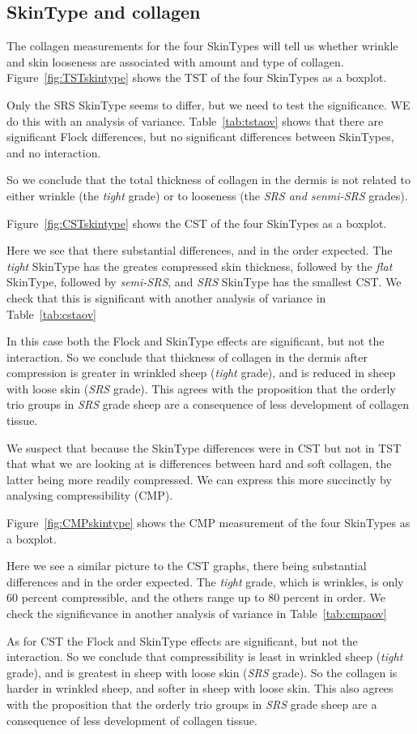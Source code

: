 \documentclass[titlepage]{article}  %
\begin{document}
\subsection{SkinType and collagen}
The collagen measurements for the four SkinTypes will tell us  whether wrinkle and skin looseness are associated with amount and type of collagen.  Figure~\ref{fig:TSTskintype} shows the TST of the four SkinTypes as a boxplot.

Only the SRS SkinType seems to differ, but we need to test the significance. WE do this with an analysis of variance. Table~\ref{tab:tstaov} shows that there are significant Flock differences, but no significant differences between SkinTypes, and no interaction.

So we conclude that the total thickness of collagen in the dermis is not related to either wrinkle (the {\em tight} grade) or to looseness (the {\em SRS and senmi-SRS} grades).

Figure~\ref{fig:CSTskintype} shows the CST of the four SkinTypes as a boxplot.

Here we see that there substantial differences, and in the order expected. The {\em tight} SkinType has the greates compressed skin thickness, followed by the {\em flat} SkinType, followed by {\em semi-SRS}, and {\em SRS} SkinType has the smallest CST. We check that this is significant with another analysis of variance in Table~\ref{tab:cstaov}
  
In this case both the Flock and SkinType effects are significant, but not the interaction. So we conclude that thickness of collagen in the dermis after compression is greater in wrinkled sheep ({\em tight} grade), and is reduced in sheep with loose skin ({\em SRS} grade). This agrees with the proposition that the orderly trio groups in {\em SRS} grade sheep are a  consequence of less development of collagen tissue.

We suspect that because the SkinType differences were in CST but not in TST that what we are looking at is differences between hard and soft collagen, the latter being more readily compressed. We can express this more succinctly by analysing compressibility (CMP).

Figure~\ref{fig:CMPskintype} shows the CMP measurement of the four SkinTypes as a boxplot.

Here we see a similar picture to the CST graphs, there being substantial differences and in the order expected. The {\em tight} grade, which is wrinkles, is only 60 percent compressible, and the others range up to 80 percent in order. We check the significvance in another analysis of variance in Table~\ref{tab:cmpaov}

As for CST the Flock and SkinType effects are significant, but not the interaction. So we conclude that compressibility is least in wrinkled sheep ({\em tight} grade), and is greatest in sheep with loose skin ({\em SRS} grade). So the collagen is harder in wrinkled sheep, and softer in sheep with loose skin. This also agrees with the proposition that the orderly trio groups in {\em SRS} grade sheep are a  consequence of less development of collagen tissue.
\end{document}
